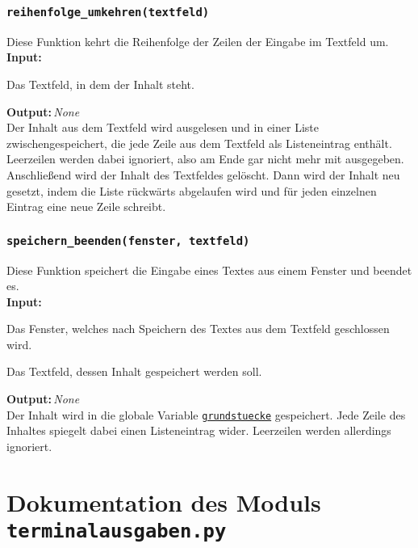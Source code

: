 \documentclass{article}
\newcommand{\initem}[2]{\item[\hspace{0.5em} {\normalfont\ttfamily{#1}} {\normalfont\itshape{(#2)}}]}
\newcommand{\bfpara}[1]{\noindent \textbf{#1:}\,}
\begin{document}
\subsubsection*{\texttt{reihenfolge\_umkehren(textfeld)}}\label{subsubsec:reihenfolge_umkehren}
Diese Funktion kehrt die Reihenfolge der Zeilen der Eingabe im Textfeld um.\\

\bfpara{Input}
\begin{compactdesc}
	\initem{textfeld}{tkinter.Text} Das Textfeld, in dem der Inhalt steht.
\end{compactdesc}
\bfpara{Output}{\textit{None}}\\

Der Inhalt aus dem Textfeld wird ausgelesen und in einer Liste zwischengespeichert, die jede Zeile aus dem Textfeld als Listeneintrag enth\"alt. Leerzeilen werden dabei ignoriert, also am Ende gar nicht mehr mit ausgegeben. Anschlie{\ss}end wird der Inhalt des Textfeldes gel\"oscht. Dann wird der Inhalt neu gesetzt, indem die Liste r\"uckw\"arts abgelaufen wird und f\"ur jeden einzelnen Eintrag eine neue Zeile schreibt.\\[11pt]

\subsubsection*{\texttt{speichern\_beenden(fenster, textfeld)}}\label{subsubsec:speichern_beenden}
Diese Funktion speichert die Eingabe eines Textes aus einem Fenster und beendet es.\\

\bfpara{Input}
\begin{compactdesc}
	\initem{fenster}{tkinter.Tk} Das Fenster, welches nach Speichern des Textes aus dem Textfeld geschlossen wird.
	\initem{textfeld}{tkinter.Text} Das Textfeld, dessen Inhalt gespeichert werden soll.
\end{compactdesc}
\bfpara{Output}{\textit{None}}\\

Der Inhalt wird in die globale Variable \hyperref[subsec:globale_variablen]{\texttt{grundstuecke}} gespeichert. Jede Zeile des Inhaltes spiegelt dabei einen Listeneintrag wider. Leerzeilen werden allerdings ignoriert.\newpage


\section{Dokumentation des Moduls \texttt{terminalausgaben.py}}
\end{document}
